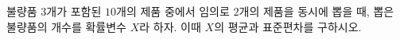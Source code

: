 불량품 $3$개가 포함된 $10$개의 제품 중에서 임의로 $2$개의 제품을 동시에 뽑을 때, 뽑은 불량품의 개수를 확률변수 $X$라 하자. 이때 $X$의 평균과 표준편차를 구하시오.
